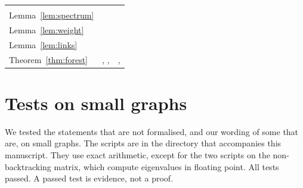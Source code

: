 \documentclass[11pt]{article}
\theoremstyle{definition}
\theoremstyle{remark}
\begin{document}
\begin{center}
\begin{tabular}{@{}L{3.7cm}L{6.3cm}L{5.6cm}@{}}
   \\
Lemma~\ref{lem:spectrum} &  &
   \\
Lemma~\ref{lem:weight} &  &
   \\
Lemma~\ref{lem:links} &  &  \\
Theorem~\ref{thm:forest} & , ,
   & ,
   \\
\bottomrule
\end{tabular}
\label{tab:steps}
\end{center}

\section{Tests on small graphs}\label{app:checks}

We tested the statements that are not formalised, and our wording of some that are, on small graphs.
The scripts are in the directory  that accompanies this manuscript. They use
exact arithmetic, except for the two scripts on the non-backtracking matrix, which compute
eigenvalues in floating point. All tests passed. A passed test is evidence, not a proof.
\end{document}

